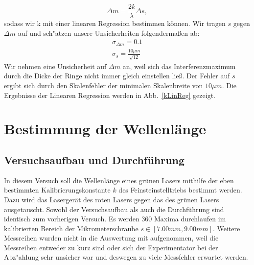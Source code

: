 \documentclass[12pt,a4paper]{article}
\begin{document}
\begin{equation}
\Delta m = \frac{2k}{\lambda}\Delta s,
\end{equation}
sodass wir k mit einer linearen Regression bestimmen können. Wir tragen $s$ gegen $\Delta m$ auf und sch"atzen unsere Unsicherheiten folgendermaßen ab:
\begin{align}\label{eq:Unsicherheit_Kalibrierung}
\sigma_{\Delta m}=0.1\\
\sigma_s=\frac{10\mu m}{\sqrt{12}}
\end{align}
Wir nehmen eine Unsicherheit auf $\Delta m$ an, weil sich das Interferenzmaximum durch die Dicke der Ringe nicht immer gleich einstellen lie\ss. Der Fehler auf $s$ ergibt sich durch den Skalenfehler der minimalen Skalenbreite von $10\mu m$. Die Ergebnisse der Linearen Regression werden in Abb.~\ref{kLinReg} gezeigt.

\section{Bestimmung der Wellenlänge}
\subsection{Versuchsaufbau und Durchführung}
In diesem Versuch soll die Wellenlänge eines grünen Lasers mithilfe der eben bestimmten Kalibrierungskonstante $k$ des Feinsteinstelltriebs bestimmt werden. Dazu wird das Lasergerät des roten Lasers gegen das des grünen Lasers ausgetauscht. Sowohl der Versuchsaufbau als auch die Durchführung sind identisch zum vorherigen Versuch. Es werden 360 Maxima durchlaufen im kalibrierten Bereich der Mikrometerschraube $s\in[7.00mm,9.00mm]$.
Weitere Messreihen wurden nicht in die Auswertung mit aufgenommen, weil die Messreihen entweder zu kurz sind oder sich der Experimentator bei der Abz"ahlung sehr unsicher war und deswegen zu viele Messfehler erwartet werden.
\end{document}
